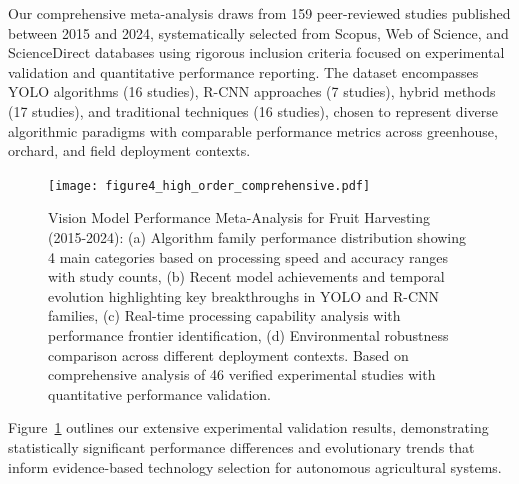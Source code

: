 \documentclass{ieeeaccess}
\begin{document}
Our comprehensive meta-analysis draws from 159 peer-reviewed studies published between 2015 and 2024, systematically selected from Scopus, Web of Science, and ScienceDirect databases using rigorous inclusion criteria focused on experimental validation and quantitative performance reporting. The dataset encompasses YOLO algorithms (16 studies), R-CNN approaches (7 studies), hybrid methods (17 studies), and traditional techniques (16 studies), chosen to represent diverse algorithmic paradigms with comparable performance metrics across greenhouse, orchard, and field deployment contexts.

\begin{figure}[htbp]
\centering
\texttt{[image: figure4\_high\_order\_comprehensive.pdf]}
\caption{Vision Model Performance Meta-Analysis for Fruit Harvesting (2015-2024): (a) Algorithm family performance distribution showing 4 main categories based on processing speed and accuracy ranges with study counts, (b) Recent model achievements and temporal evolution highlighting key breakthroughs in YOLO and R-CNN families, (c) Real-time processing capability analysis with performance frontier identification, (d) Environmental robustness comparison across different deployment contexts. Based on comprehensive analysis of 46 verified experimental studies with quantitative performance validation.}
\label{fig:meta_analysis_ieee}
\end{figure}

Figure~\ref{fig:meta_analysis_ieee} outlines our extensive experimental validation results, demonstrating statistically significant performance differences and evolutionary trends that inform evidence-based technology selection for autonomous agricultural systems.
\end{document}
